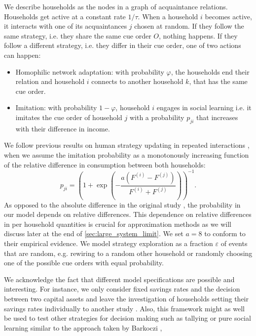 We describe households as the nodes in a graph of acquaintance relations. Households get active at a constant rate $1/\tau$. When a household $i$ becomes active, it interacts with one of its acquaintances $j$ chosen at random. If they follow the same strategy, i.e. they share the same cue order $O$, nothing happens. If they follow a different strategy, i.e. they differ in their cue order, one of two actions can happen:
\begin{itemize}
	\item Homophilic network adaptation: with probability $\varphi$, the households end their relation and household $i$ connects to another household $k$, that has the same cue order. 
	\item Imitation: with probability $1-\varphi$, household $i$ engages in social learning i.e. it imitates the cue order of household $j$ with a probability $p_{ji}$ that increases with their difference in income.
\end{itemize}
We follow previous results on human strategy updating in repeated interactions \cite{Traulsen2010}, when we assume the imitation probability as a monotonously increasing function of the relative difference in consumption between both households:
\begin{equation}
	p_{ji} =  \left(1 + \exp \left(- \frac{a(F^{(i)} - F^{(j)})}{F^{(i)} + F^{(j)}} \right) \right)^{-1}.
    \label{eq:imitation_probability}
\end{equation}
As opposed to the absolute difference in the original study \cite{Traulsen2010}, the probability in our model depends on relative differences. This dependence on relative differences in per household quantities is crucial for approximation methods as we will discuss later at the end of \ref{sec:large_system_limit}.
We set $a = 8$ to conform to their empirical evidence.
We model strategy exploration as a fraction $\varepsilon$ of events that are random, e.g. rewiring to a random other household or randomly choosing one of the possible cue orders with equal probability.

We acknowledge the fact that different model specifications are possible and interesting.
For instance, we only consider fixed savings rates and the decision between two capital assets and leave the investigation of households setting their savings rates individually to another study \cite{Asano2018}.
Also, this framework might as well be used to test other strategies for decision making such as tallying or pure social learning similar to the approach taken by Barkoczi \cite{Barkoczi2013a}, \cite{Barkoczi2016}

